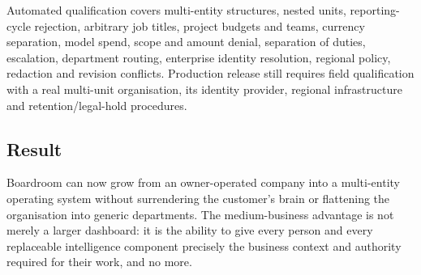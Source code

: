 Automated qualification covers multi-entity structures, nested units, reporting-cycle
rejection, arbitrary job titles, project budgets and teams, currency separation, model spend,
scope and amount denial, separation of duties, escalation, department routing, enterprise
identity resolution, regional policy, redaction and revision conflicts.  Production release
still requires field qualification with a real multi-unit organisation, its identity provider,
regional infrastructure and retention/legal-hold procedures.

\subsection{Result}

Boardroom can now grow from an owner-operated company into a multi-entity operating system
without surrendering the customer's brain or flattening the organisation into generic
departments.  The medium-business advantage is not merely a larger dashboard: it is the ability
to give every person and every replaceable intelligence component precisely the business
context and authority required for their work, and no more.
